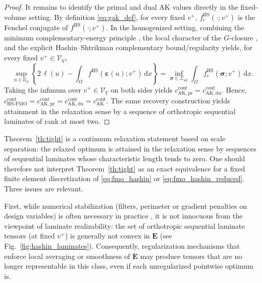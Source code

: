 \documentclass[preprint,3p]{elsarticle}
\newcommand{\tens}[1]{\bm{\mathit{#1}}}             %
\newcommand{\tenss}[1]{\bm{\mathbf{#1}}}            %
\newcommand{\tensf}[1]{\bm{\mathbf{#1}}}            %
\newcommand{\strain}{\tenss{\varepsilon}}           %
\newcommand{\stress}{\tenss{\sigma}}                %
\begin{document}
\begin{proof}
It remains to identify the primal and dual AK values directly in the fixed-volume setting. By definition \eqref{eq:gak_def}, for every fixed $v^+$, $f_{\mathrm{c}}^{\mathrm{HS}}(\cdot;v^+)$ is the Fenchel conjugate of $f^{\mathrm{HS}}(\cdot;v^+)$. In the homogenized setting, combining the minimum complementary-energy principle \citep[Theorem~4.1.9 and Eqs.~(4.36)--(4.39)]{Allaire2002}, the local character of the $G$-closure \citep[Theorem~2.1.2]{Allaire2002}, and the explicit Hashin--Shtrikman complementary bound/regularity \citep[Proposition~2.3.25 and Remark~2.3.27]{Allaire2002} yields, for every fixed $v^+\in\mathcal V_{\overline{V}}$,
%
\begin{equation}
\sup_{\tens{u}\in\mathcal U_0}
\left\{
2\,\ell(\tens{u})
-\int_\Omega f^{\mathrm{HS}}(\strain(\tens{u});v^+)\,\mathrm d\tens{x}
\right\}
=
\inf_{\stress\in\Sigma_{\mathrm{ad}}}
\int_\Omega f_{\mathrm{c}}^{\mathrm{HS}}(\stress;v^+)\,\mathrm d\tens{x}.
\end{equation}
%
Taking the infimum over $v^+\in\mathcal V_{\overline{V}}$ on both sides yields $c_{\mathrm{AK,pr}}^{\mathrm{cont}} = c_{\mathrm{AK,du}}^{\mathrm{cont}}$. Hence, $c_{\mathrm{HS\text{-}FMO}}^{\mathrm{cont}} = c_{\mathrm{AK,pr}}^{\mathrm{cont}} = c_{\mathrm{AK,du}}^{\mathrm{cont}} = c_{\mathrm{AK}}^{\mathrm{cont}}$. The same recovery construction yields attainment in the relaxation sense by a sequence of orthotropic sequential laminates of rank at most two.
\end{proof}

Theorem~\ref{th:tight} is a continuum relaxation statement based on scale separation: the relaxed optimum is attained in the relaxation sense by sequences of sequential laminates whose characteristic length tends to zero. One should therefore not interpret Theorem~\ref{th:tight} as an exact equivalence for a fixed finite element discretization of \eqref{eq:fmo_hashin} or \eqref{eq:fmo_hashin_reduced}. Three issues are relevant.

First, while numerical stabilization (filters, perimeter or gradient penalties on design variables) is often necessary in practice \citep{Jog1994}, it is not innocuous from the viewpoint of laminate realizability: the set of orthotropic sequential laminate tensors (at fixed $v^+$) is generally not convex in $\tensf{E}$ (see Fig.~\ref{fig:hashin_laminates}). Consequently, regularization mechanisms that enforce local averaging or smoothness of $\tensf{E}$ may produce tensors that are no longer representable in this class, even if each unregularized pointwise optimum is.
\end{document}
